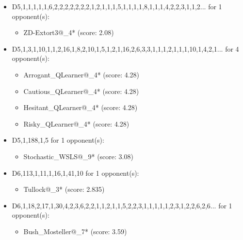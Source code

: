 \begin{appendices}
\begin{itemize}
    \item D5,1,1,1,1,1,6,2,2,2,2,2,2,2,1,2,1,1,1,5,1,1,1,1,8,1,1,1,4,2,2,3,1,1,2... for 1 opponent(s):
    \begin{multicols}{3}
         \begin{itemize}
            \item ZD-Extort3@\_4* (score: 2.08)
        \end{itemize}
     \end{multicols}
     
    \item D5,1,3,1,10,1,1,2,16,1,8,2,10,1,5,1,2,1,16,2,6,3,3,1,1,1,2,1,1,1,10,1,4,2,1... for 4 opponent(s):
    \begin{multicols}{3}
         \begin{itemize}
            \item Arrogant\_QLearner@\_4* (score: 4.28)
            \item Cautious\_QLearner@\_4* (score: 4.28)
            \item Hesitant\_QLearner@\_4* (score: 4.28)
            \item Risky\_QLearner@\_4* (score: 4.28)
        \end{itemize}
     \end{multicols}
     
    \item D5,1,188,1,5 for 1 opponent(s):
    \begin{multicols}{3}
         \begin{itemize}
            \item Stochastic\_WSLS@\_9* (score: 3.08)
        \end{itemize}
     \end{multicols}
     
    \item D6,113,1,11,1,16,1,41,10 for 1 opponent(s):
    \begin{multicols}{3}
         \begin{itemize}
            \item Tullock@\_3* (score: 2.835)
        \end{itemize}
     \end{multicols}
     
    \item D6,1,18,2,17,1,30,4,2,3,6,2,2,1,1,2,1,1,5,2,2,3,1,1,1,1,1,2,3,1,2,2,6,2,6... for 1 opponent(s):
    \begin{multicols}{3}
         \begin{itemize}
            \item Bush\_Mosteller@\_7* (score: 3.59)
        \end{itemize}
     \end{multicols}
     

\end{itemize}
\end{appendices}
